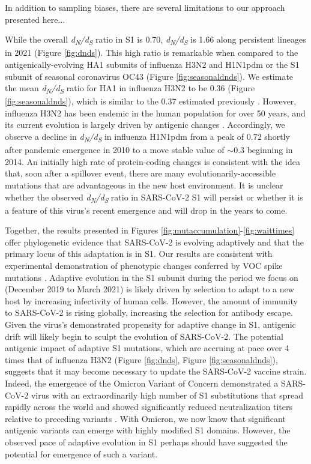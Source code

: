 \documentclass[11pt,oneside,letterpaper]{article}
\newcommand{\dnds}{\emph{d\textsubscript{N}/d\textsubscript{S}}}
\begin{document}
In addition to sampling biases, there are several limitations to our approach presented here...

While the overall \dnds{} ratio in S1 is 0.70, \dnds{} is 1.66 along persistent lineages in 2021 (Figure \ref{fig:dnds}).
This high ratio is remarkable when compared to the antigenically-evolving HA1 subunits of influenza H3N2 and H1N1pdm or the S1 subunit of seasonal coronavirus OC43 (Figure \ref{fig:seasonaldnds}).
We estimate the mean \dnds{} ratio for HA1 in influenza H3N2 to be 0.36 (Figure \ref{fig:seasonaldnds}), which is similar to the 0.37 estimated previously \cite{Wolf2006-vy}.
However, influenza H3N2 has been endemic in the human population for over 50 years, and its current evolution is largely driven by antigenic changes \cite{Smith2004-if}.
Accordingly, we observe a decline in \dnds{} in influenza H1N1pdm from a peak of 0.72 shortly after pandemic emergence in 2010 to a move stable value of $\sim$0.3 beginning in 2014.
An initially high rate of protein-coding changes is consistent with the idea that, soon after a spillover event, there are many evolutionarily-accessible mutations that are advantageous in the new host environment.
It is unclear whether the observed \dnds{} ratio in SARS-CoV-2 S1 will persist or whether it is a feature of this virus's recent emergence and will drop in the years to come.

Together, the results presented in Figures \ref{fig:mutaccumulation}-\ref{fig:waittimes} offer phylogenetic evidence that SARS-CoV-2 is evolving adaptively and that the primary locus of this adaptation is in S1.
Our results are consistent with experimental demonstration of phenotypic changes conferred by VOC spike mutations \cite{Wang2021-dm, Greaney2021-jn, Li2020-jd, Liu2021-ne}.
Adaptive evolution in the S1 subunit during the period we focus on (December 2019 to March 2021) is likely driven by selection to adapt to a new host by increasing infectivity of human cells.
However, the amount of immunity to SARS-CoV-2 is rising globally, increasing the selection for antibody escape.
Given the virus's demonstrated propensity for adaptive change in S1, antigenic drift will likely begin to sculpt the evolution of SARS-CoV-2.
The potential antigenic impact of adaptive S1 mutations, which are accruing at pace over 4 times that of influenza H3N2 (Figure \ref{fig:dnds}, Figure \ref{fig:seasonaldnds}), suggests that it may become necessary to update the SARS-CoV-2 vaccine strain.
Indeed, the emergence of the Omicron Variant of Concern demonstrated a SARS-CoV-2 virus with an extraordinarily high number of S1 substitutions \cite{viana2021rapid} that spread rapidly across the world and showed significantly reduced neutralization titers  relative to preceding variants \cite{cele2021omicron}.
With Omicron, we now know that significant antigenic variants can emerge with highly modified S1 domains.
However, the observed pace of adaptive evolution in S1 perhaps should have suggested the potential for emergence of such a variant.
\end{document}
